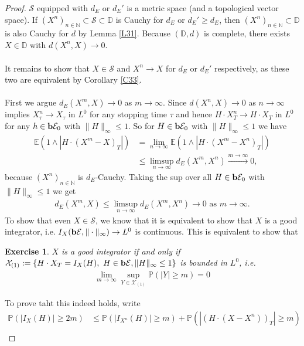 \documentclass[12pt,a4paper, twoside]{article}
\newtheorem{exe}{Exercise}[section]
\theoremstyle{definition}
\newcommand{\EE}{\mathbb{E}} %
\newcommand{\PP}{\mathbb{P}} %
\newcommand{\simple}{\textbf{\text{b}}\mathcal{E}}
\begin{document}
\begin{proof}
$\mathcal{S}$ equipped with $d_E$ or $d_E'$ is a metric space (and a topological vector space). If $(X^n)_{n \in \mathbb{N}} \subset \mathcal{S} \subset \mathbb{D}$ is Cauchy for $d_E$ or $d_E' \geq d_E$, then $(X^n)_{n \in \mathbb{N}} \subset \mathbb{D}$ is also Cauchy for $d$ by Lemma \ref{L31}. Because $( \mathbb{D},d)$ is complete, there exists $X \in \mathbb{D}$ with $d(X^n,X) \to 0$. 
\\\\
It remains to show that $X \in \mathcal{S}$ and $X^n \to X$ for $d_E$ or $d_E'$ respectively, as these two are equivalent by Corollary \ref{C33}. \\
\\
First we argue $d_E(X^m,X) \to 0$ as $m \to \infty$. Since $d(X^n, X) \to 0$ as $n \to \infty$ implies $X_\tau^n \to X_\tau$ in $L^0$ for any stopping time $\tau$ and hence $H \cdot X_T^n \to H \cdot X_T$ in $L^0$ for any $h \in \simple_0$ with $\|H\|_\infty \leq 1$. So for $H \in \simple_0$ with $\|H\|_\infty \leq 1$ we have 
\begin{align*}
\EE(1 \wedge | H \cdot (X^m-X)_T|) &= \lim_{n \to \infty} \EE(1 \wedge |H \cdot (X^m-X^n)_T|) \\ &\leq \limsup_{n \to \infty} d_E(X^m , X^n) \xrightarrow{m \to \infty} 0,
\end{align*}
because $(X^n)_{n \in \mathbb{N}}$ is $d_E$-Cauchy. Taking the sup over all $H \in \simple_0$ with $\|H\|_\infty \leq 1$ we get 
\begin{align*}
d_E(X^m, X) \leq \limsup_{n \to \infty} d_E(X^m,X^n) \to 0 \text{ as } m \to \infty. 
\end{align*}
To show that even $X \in \mathcal{S}$, we know that it is equivalent to show that $X$ is a good integrator, i.e. $I_X(\simple , \| \cdot \|_\infty) \to L^0$ is continuous. This is equivalent to show that 
\begin{exe} $X$ is a good integrator if and only if $\mathcal{X}_{(1)}:= \{ H \cdot X_T = I_X(H), \ H \in \simple, \|H\|_\infty \leq 1\}$ is bounded in $L^0$, i.e.
\begin{align*}
\lim_{m \to \infty} \sup_{Y \in \mathcal{X}_{(1)}} \PP( |Y| \geq m)=0
\end{align*}
\end{exe}
To prove taht this indeed holds, write
\begin{align*}
\PP(|I_X(H)| \geq 2m) &\leq \PP( |I_{X^n}(H)| \geq m) +  \PP( |(H \cdot (X-X^n))_T| \geq m) \\

\end{align*}
\end{proof}
\end{document}

